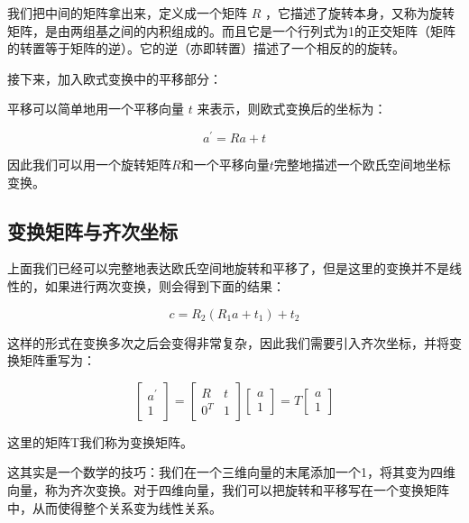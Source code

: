 \documentclass[10pt, oneside]{book}
\begin{document}
我们把中间的矩阵拿出来，定义成一个矩阵 $R$ ，它描述了旋转本身，又称为旋转矩阵，是由两组基之间的内积组成的。而且它是一个行列式为1的正交矩阵（矩阵的转置等于矩阵的逆）。它的逆（亦即转置）描述了一个相反的的旋转。

接下来，加入欧式变换中的平移部分：

平移可以简单地用一个平移向量 $t$ 来表示，则欧式变换后的坐标为：

\begin{equation}
    a^\prime = Ra + t
\end{equation}

因此我们可以用一个旋转矩阵$R$和一个平移向量$t$完整地描述一个欧氏空间地坐标变换。

\subsection{变换矩阵与齐次坐标}

上面我们已经可以完整地表达欧氏空间地旋转和平移了，但是这里的变换并不是线性的，如果进行两次变换，则会得到下面的结果：

\begin{equation}
    c = R_2(R_1a+t_1)+t_2
\end{equation}

这样的形式在变换多次之后会变得非常复杂，因此我们需要引入齐次坐标，并将变换矩阵重写为：

\begin{equation}
    \begin{bmatrix}
        a^\prime \\
        1
       \end{bmatrix}
       =
       \begin{bmatrix}
        R & t\\
        0^T & 1
       \end{bmatrix}
       \begin{bmatrix}
        a\\
        1
       \end{bmatrix}
       =
       T
       \begin{bmatrix}
        a\\
        1
       \end{bmatrix}
\end{equation}

这里的矩阵T我们称为变换矩阵。

这其实是一个数学的技巧：我们在一个三维向量的末尾添加一个1，将其变为四维向量，称为齐次变换。对于四维向量，我们可以把旋转和平移写在一个变换矩阵中，从而使得整个关系变为线性关系。
\end{document}
